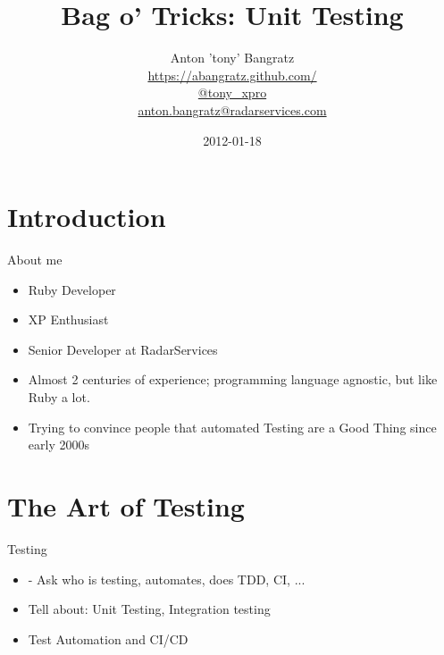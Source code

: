 \documentclass[style=paintings,display=slidesnotes,clock]{powerdot}
\title{Bag o' Tricks: Unit Testing}
\author{Anton 'tony' Bangratz\\
	\url{https://abangratz.github.com/}\\
	\url{@tony_xpro}\\
\url{anton.bangratz@radarservices.com}}
\date{2012-01-18}
\begin{document}
\maketitle
\section{Introduction}
\begin{note}{About me}
	\begin{itemize}
		\item Ruby Developer
		\item XP Enthusiast
		\item Senior Developer at RadarServices
		\item Almost 2 centuries of experience; programming language agnostic, but like Ruby a lot. 
		\item Trying to convince people that automated Testing are a Good Thing since early 2000s
	\end{itemize}
\end{note}
\section{The Art of Testing}
\begin{note}{Testing}
	\begin{itemize}
		\item - Ask who is testing, automates, does TDD, CI, ...
		\item Tell about: Unit Testing, Integration testing
		\item Test Automation and CI/CD
	\end{itemize}
\end{note}
\end{document}
